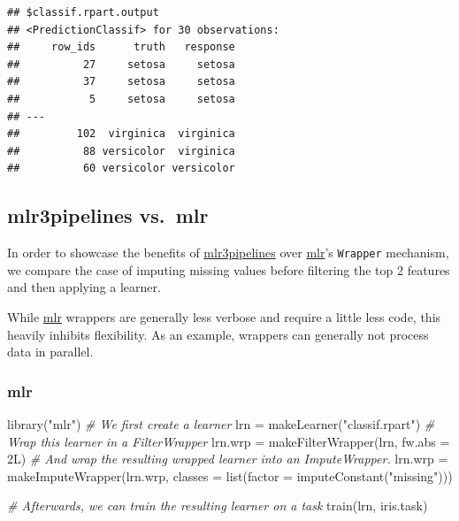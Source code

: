 \documentclass[
]{scrbook}
\newenvironment{Shaded}{\begin{snugshade}}{\end{snugshade}}
\newcommand{\AttributeTok}[1]{\textcolor[rgb]{0.77,0.63,0.00}{#1}}
\newcommand{\CommentTok}[1]{\textcolor[rgb]{0.56,0.35,0.01}{\textit{#1}}}
\newcommand{\FunctionTok}[1]{\textcolor[rgb]{0.00,0.00,0.00}{#1}}
\newcommand{\NormalTok}[1]{#1}
\newcommand{\OtherTok}[1]{\textcolor[rgb]{0.56,0.35,0.01}{#1}}
\newcommand{\StringTok}[1]{\textcolor[rgb]{0.31,0.60,0.02}{#1}}
\renewenvironment{Shaded} {\begin{snugshade}\small} {\end{snugshade}}
\begin{document}
\begin{verbatim}
## $classif.rpart.output
## <PredictionClassif> for 30 observations:
##     row_ids      truth   response
##          27     setosa     setosa
##          37     setosa     setosa
##           5     setosa     setosa
## ---                              
##         102  virginica  virginica
##          88 versicolor  virginica
##          60 versicolor versicolor
\end{verbatim}

\hypertarget{mlr3pipelines-vs.-mlr}{%
\subsection{mlr3pipelines vs.~mlr}\label{mlr3pipelines-vs.-mlr}}

In order to showcase the benefits of \href{https://cran.r-project.org/package=mlr3pipelines}{mlr3pipelines} over \href{https://cran.r-project.org/package=mlr}{mlr}'s \texttt{Wrapper} mechanism, we compare the case of imputing missing values before filtering the top 2 features and then applying a learner.

While \href{https://cran.r-project.org/package=mlr}{mlr} wrappers are generally less verbose and require a little less code, this heavily inhibits flexibility.
As an example, wrappers can generally not process data in parallel.

\hypertarget{mlr}{%
\subsubsection{mlr}\label{mlr}}

\begin{Shaded}
\begin{Highlighting}[]
\FunctionTok{library}\NormalTok{(}\StringTok{"mlr"}\NormalTok{)}
\CommentTok{\# We first create a learner}
\NormalTok{lrn }\OtherTok{=} \FunctionTok{makeLearner}\NormalTok{(}\StringTok{"classif.rpart"}\NormalTok{)}
\CommentTok{\# Wrap this learner in a FilterWrapper}
\NormalTok{lrn.wrp }\OtherTok{=} \FunctionTok{makeFilterWrapper}\NormalTok{(lrn, }\AttributeTok{fw.abs =}\NormalTok{ 2L)}
\CommentTok{\# And wrap the resulting wrapped learner into an ImputeWrapper.}
\NormalTok{lrn.wrp }\OtherTok{=} \FunctionTok{makeImputeWrapper}\NormalTok{(lrn.wrp, }\AttributeTok{classes =} \FunctionTok{list}\NormalTok{(}\AttributeTok{factor =} \FunctionTok{imputeConstant}\NormalTok{(}\StringTok{"missing"}\NormalTok{)))}

\CommentTok{\# Afterwards, we can train the resulting learner on a task}
\FunctionTok{train}\NormalTok{(lrn, iris.task)}
\end{Highlighting}
\end{Shaded}
\end{document}
